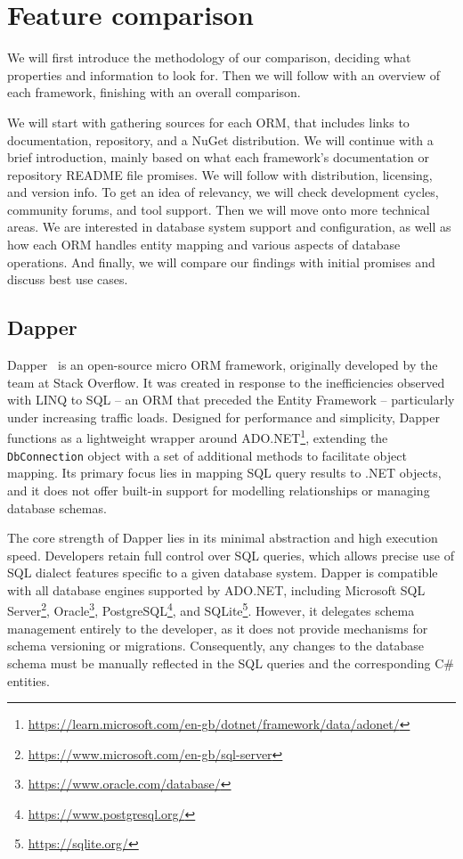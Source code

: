 \section{Feature comparison}
We will first introduce the methodology of our comparison, deciding what properties and information to look for. Then we will follow with an overview of each framework, finishing with an overall comparison.

We will start with gathering sources for each ORM, that includes links to documentation, repository, and a NuGet distribution. We will continue with a brief introduction, mainly based on what each framework's documentation or repository README file promises. We will follow with distribution, licensing, and version info. To get an idea of relevancy, we will check development cycles, community forums, and tool support. Then we will move onto more technical areas. We are interested in database system support and configuration, as well as how each ORM handles entity mapping and various aspects of database operations. And finally, we will compare our findings with initial promises and discuss best use cases.

\subsection{Dapper}\label{sec:feat_dapper}

Dapper~\cite{Dapper,DapperRepo} is an open-source micro ORM framework, originally developed by the team at Stack Overflow. It was created in response to the inefficiencies observed with LINQ to SQL -- an ORM that preceded the Entity Framework -- particularly under increasing traffic loads. Designed for performance and simplicity, Dapper functions as a lightweight wrapper around ADO.NET\footnote{\url{https://learn.microsoft.com/en-gb/dotnet/framework/data/adonet/}}, extending the \texttt{DbConnection} object with a set of additional methods to facilitate object mapping. Its primary focus lies in mapping SQL query results to .NET objects, and it does not offer built-in support for modelling relationships or managing database schemas.

The core strength of Dapper lies in its minimal abstraction and high execution speed. Developers retain full control over SQL queries, which allows precise use of SQL dialect features specific to a given database system. Dapper is compatible with all database engines supported by ADO.NET, including Microsoft SQL Server\footnote{\url{https://www.microsoft.com/en-gb/sql-server}}, Oracle\footnote{\url{https://www.oracle.com/database/}}, PostgreSQL\footnote{\url{https://www.postgresql.org/}}, and SQLite\footnote{\url{https://sqlite.org/}}. However, it delegates schema management entirely to the developer, as it does not provide mechanisms for schema versioning or migrations. Consequently, any changes to the database schema must be manually reflected in the SQL queries and the corresponding C\# entities.

